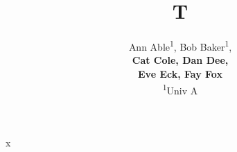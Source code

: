 \documentclass{article}
\title{T}
\author{Ann Able\textsuperscript{1}, Bob Baker\textsuperscript{1},\\\textbf{Cat Cole, Dan Dee,}\\\textbf{Eve Eck, Fay Fox}\\ \textsuperscript{1}Univ A}
\begin{document}
\maketitle
x
\end{document}
